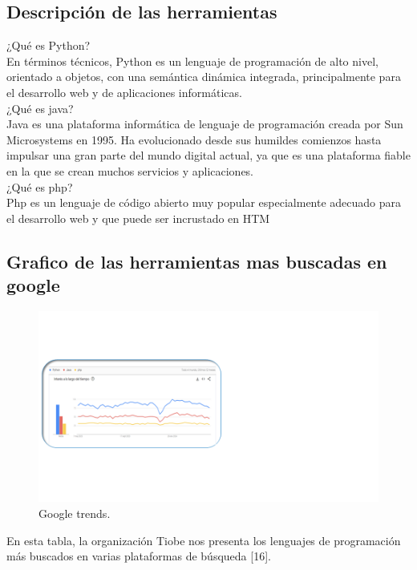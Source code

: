 \subsection{Descripción de las herramientas}
¿Qué es Python? \\
En términos técnicos, Python es un lenguaje de programación de alto nivel, orientado a objetos, con una semántica dinámica integrada, principalmente para el desarrollo web y de aplicaciones informáticas. \\
¿Qué es java? \\
Java es una plataforma informática de lenguaje de programación creada por Sun Microsystems en 1995. Ha evolucionado desde sus humildes comienzos hasta impulsar una gran parte del mundo digital actual, ya que es una plataforma fiable en la que se crean muchos servicios y aplicaciones. \\
¿Qué es php? \\
Php es un lenguaje de código abierto muy popular especialmente adecuado para el desarrollo web y que puede ser incrustado en HTM \\


\subsection{Grafico de las herramientas mas buscadas en google}
\begin{figure}[H]
    \begin{center}
    \includegraphics[scale = 1.1]{./images/Google trends.png}
    \caption{Google trends.}
    \label{fig:huella}
    \end{center}
    \end{figure}
En esta tabla, la organización Tiobe nos presenta los lenguajes de programación más buscados en varias plataformas de búsqueda [16]. \\

